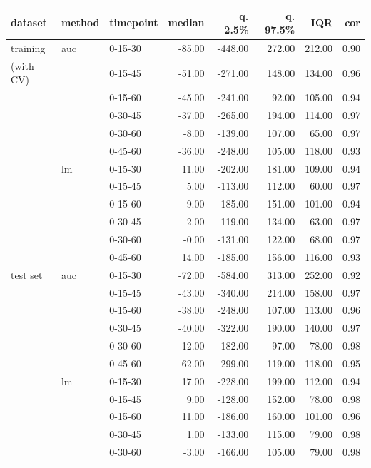 \documentclass[12pt]{article}
\begin{document}
\begin{table}[ht]
\centering
\begin{tabular}{lllrrrrr}
  \hline
dataset & method & timepoint & median & q. 2.5\% & q. 97.5\% & IQR & cor \\ 
  \hline
  \hline
training & auc & 0-15-30 & -85.00 & -448.00 & 272.00 & 212.00 & 0.90 \\ [1mm]
  (with CV) &  & 0-15-45 & -51.00 & -271.00 & 148.00 & 134.00 & 0.96 \\ 
   &  & 0-15-60 & -45.00 & -241.00 & 92.00 & 105.00 & 0.94 \\ 
   &  & 0-30-45 & -37.00 & -265.00 & 194.00 & 114.00 & 0.97 \\ 
   &  & 0-30-60 & -8.00 & -139.00 & 107.00 & 65.00 & 0.97 \\ 
   &  & 0-45-60 & -36.00 & -248.00 & 105.00 & 118.00 & 0.93 \\ 
   & lm & 0-15-30 & 11.00 & -202.00 & 181.00 & 109.00 & 0.94 \\ 
   &  & 0-15-45 & 5.00 & -113.00 & 112.00 & 60.00 & 0.97 \\ 
   &  & 0-15-60 & 9.00 & -185.00 & 151.00 & 101.00 & 0.94 \\ 
   &  & 0-30-45 & 2.00 & -119.00 & 134.00 & 63.00 & 0.97 \\ 
   &  & 0-30-60 & -0.00 & -131.00 & 122.00 & 68.00 & 0.97 \\ 
   &  & 0-45-60 & 14.00 & -185.00 & 156.00 & 116.00 & 0.93 \\  [3mm]
  test set & auc & 0-15-30 & -72.00 & -584.00 & 313.00 & 252.00 & 0.92 \\ 
   &  & 0-15-45 & -43.00 & -340.00 & 214.00 & 158.00 & 0.97 \\ 
   &  & 0-15-60 & -38.00 & -248.00 & 107.00 & 113.00 & 0.96 \\ 
   &  & 0-30-45 & -40.00 & -322.00 & 190.00 & 140.00 & 0.97 \\ 
   &  & 0-30-60 & -12.00 & -182.00 & 97.00 & 78.00 & 0.98 \\ 
   &  & 0-45-60 & -62.00 & -299.00 & 119.00 & 118.00 & 0.95 \\  [1mm]
   & lm & 0-15-30 & 17.00 & -228.00 & 199.00 & 112.00 & 0.94 \\ 
   &  & 0-15-45 & 9.00 & -128.00 & 152.00 & 78.00 & 0.98 \\ 
   &  & 0-15-60 & 11.00 & -186.00 & 160.00 & 101.00 & 0.96 \\ 
   &  & 0-30-45 & 1.00 & -133.00 & 115.00 & 79.00 & 0.98 \\ 
   &  & 0-30-60 & -3.00 & -166.00 & 105.00 & 79.00 & 0.98 \\ 

\end{tabular}
\end{table}
\end{document}
